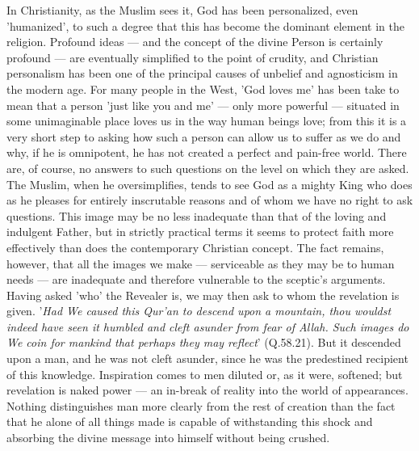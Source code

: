 \documentclass[10pt, twoside,openright]{book}
\begin{document}
In Christianity, as the Muslim sees it, God has been personalized, even 'humanized', to such a degree 
that this has become the dominant element in the religion. Profound ideas --- and the concept of the 
divine Person is certainly profound --- are eventually simplified to the point of crudity, and 
Christian personalism has been one of the principal causes of unbelief and agnosticism in the modern 
age. For many people in the West, 'God loves me' has been take to mean that a person 'just like you 
and me' --- only more powerful --- situated in some unimaginable place loves us in the way human beings 
love; from this it is a very short step to asking how such a person can allow us to suffer as we do 
and why, if he is omnipotent, he has not created a perfect and pain\hyp{}free world. There are, of course, 
no answers to such questions on the level on which they are asked. \\

The Muslim, when he oversimplifies, tends to see God as a mighty King who does as he pleases for 
entirely inscrutable reasons and of whom we have no right to ask questions. This image may be no less 				
inadequate than that of the loving and indulgent Father, but in strictly practical terms it seems to 
protect faith more effectively than does the contemporary Christian concept. The fact remains, 
however, that all the images we make --- serviceable as they may be to human needs --- are inadequate and therefore vulnerable to the sceptic's arguments. \\

Having asked 'who' the Revealer is, we may then ask to whom the revelation is given. '\emph{Had We caused this Qur'an to descend upon a mountain, thou wouldst indeed have seen it humbled and cleft asunder from fear of Allah. Such images do We coin for mankind that perhaps they may reflect}' (Q.58.21). But it descended upon a man, and he was not cleft asunder, since he was the predestined recipient of this knowledge. Inspiration comes to men diluted or, as it were, softened; but revelation is naked power --- an in\hyp{}break of reality into the world of appearances. Nothing distinguishes man more clearly from the rest of creation than the fact that he alone of all things made is capable of withstanding this shock and absorbing the divine message into himself without being crushed. \\
\end{document}
